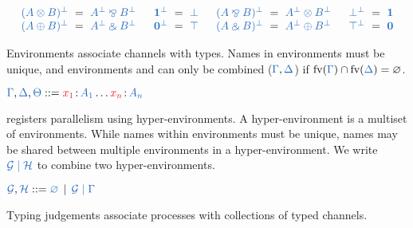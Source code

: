 \documentclass[UKenglish]{llncs}
\begin{document}
\begin{definition}[Duality]\label{def:cp-negation}
  \[
    \setlength{\arraycolsep}{3pt}
    \begin{array}{lclclcllclclcl}
              \ty{(A \tens B)^\bot} &=& \ty{A^\bot \parr B^\bot}
      &\quad \ty{\one^\bot}        &=& \ty{\bot}
      &\quad \ty{(A \parr B)^\bot} &=& \ty{A^\bot \tens B^\bot}
      &\quad \ty{\bot^\bot}        &=& \ty{\one}
      \\      \ty{(A \plus B)^\bot} &=& \ty{A^\bot \with B^\bot}
      &\quad \ty{\nil^\bot}        &=& \ty{\top}
      &\quad \ty{(A \with B)^\bot} &=& \ty{A^\bot \plus B^\bot}
      &\quad \ty{\top^\bot}        &=& \ty{\nil}
    \end{array}
  \]
\end{definition}
Environments associate channels with types. Names in environments must be unique, and environments \ty{\Gamma} and \ty{\Delta} can only be combined ($\ty{\Gamma}, \ty{\Delta}$) if $\text{fv}(\ty{\Gamma}) \cap \text{fv}(\ty{\Delta}) = \varnothing$. 
\begin{definition}[Environments]\label{def:cp-environments}
  $\ty{\Gamma}, \ty{\Delta}, \ty{\Theta} ::= \tmty{x_1}{A_1}\dots\tmty{x_n}{A_n}$
\end{definition}
\hcp registers parallelism using hyper-environments. A hyper-environment is a multiset of environments. While names within environments must be unique, names may be shared between multiple environments in a hyper-environment. We write $\ty{\mathcal{G} \hsep \mathcal{H}}$ to combine two hyper-environments.
\begin{definition}\label{def:hcp-hyper-environment}
  $\ty{\mathcal{G}}, \ty{\mathcal{H}} ::= \ty{\emptyhypercontext} \, \mid \, \ty{\mathcal{G} \hsep \Gamma}$
\end{definition}
Typing judgements associate processes with collections of typed channels.
\end{document}
